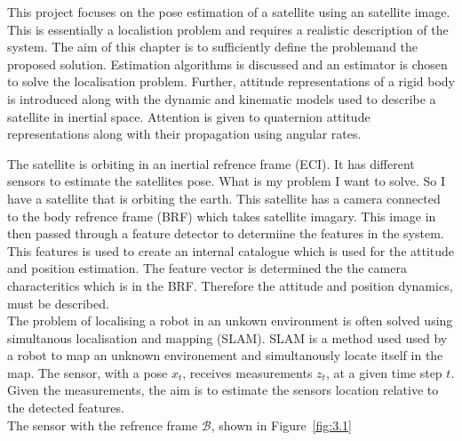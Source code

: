 \label{chap:modelling}

\label{sec:modintro}

This project focuses on the pose estimation of a satellite using an satellite image. This is essentially a localistion problem
and requires a realistic description of the system. The aim of this chapter is to sufficiently define the problemand the proposed solution. Estimation
algorithms is discussed and an estimator is chosen to solve the localisation problem. Further, attitude representations of a rigid body is introduced
along with the dynamic and kinematic models used to describe a satellite in inertial space. Attention is given to quaternion attitude representations along
with their propagation using angular rates.

\label{sec:moddef}

\noindent The satellite is orbiting in an inertial refrence frame (ECI). It has different sensors to estimate the satellites pose. 
What is my problem I want to solve. So I have a satellite that is orbiting the earth. This satellite has a camera connected to the body refrence frame
(BRF) which takes satellite imagary. This image in then passed through a feature detector to determiine the features in the system. This features is used to create
an internal catalogue which is used for the attitude and position estimation. The feature vector is determined the the camera characteritics which is in the BRF.
Therefore the attitude and position dynamics, must be described.\\

\noindent The problem of localising a robot in an unkown environment is often solved using simultanous localisation and mapping (SLAM). SLAM is a method used
used by a robot to map an unknown environement and simultanously locate itself in the map. The sensor, with a pose $x_t$, receives measurements $z_t$, at a given
time step $t$. Given the measurements, the aim is to estimate the sensors location relative to the detected features.\\

\noindent The sensor with the refrence frame $\mathcal{B}$, shown in Figure~\ref{fig:3.1}


